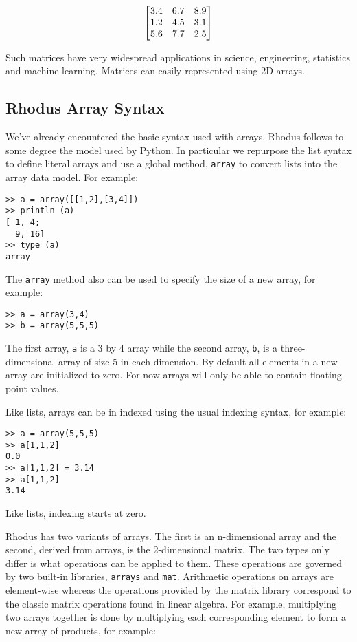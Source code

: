 $$
\setlength{\delimitershortfall}{0pt}
\begin{bmatrix}
3.4 & 6.7 &  8.9\\
1.2 & 4.5 & 3.1 \\
5.6 & 7.7 & 2.5
\end{bmatrix}
$$

Such matrices have very widespread applications in science, engineering, statistics and machine learning. Matrices can easily represented using 2D arrays.

\subsection*{Rhodus Array Syntax}

We've already encountered the basic syntax used with arrays. Rhodus follows to some degree the model used by Python. In particular we repurpose the list syntax to define literal arrays and use a global method, {\tt array} to convert lists into the array data model. For example:

\begin{lstlisting}
>> a = array([[1,2],[3,4]])
>> println (a)
[ 1, 4;
  9, 16]
>> type (a)
array
\end{lstlisting}

The {\tt array} method also can be used to specify the size of a new array, for example:

\begin{lstlisting}
>> a = array(3,4)
>> b = array(5,5,5)
\end{lstlisting}

The first array, {\tt a} is a 3 by 4 array while the second array, {\tt b}, is a three-dimensional array of size 5 in each dimension. By default all elements in a new array are initialized to zero.
For now arrays will only be able to contain floating point values.

Like lists, arrays can be in indexed using the usual indexing syntax, for example:

\begin{lstlisting}
>> a = array(5,5,5)
>> a[1,1,2]
0.0
>> a[1,1,2] = 3.14
>> a[1,1,2]
3.14
\end{lstlisting}

Like lists, indexing starts at zero.

Rhodus has two variants of arrays. The first is an n-dimensional array and the second, derived from arrays, is the 2-dimensional matrix. The two types only differ is what operations can be applied to them. These operations are governed by two built-in libraries, {\tt arrays} and {\tt mat}. Arithmetic operations on arrays are element-wise whereas the operations provided by the matrix library correspond to the classic matrix operations found in linear algebra. For example, multiplying two arrays together is done by multiplying each corresponding element to form a new array of products, for example:

